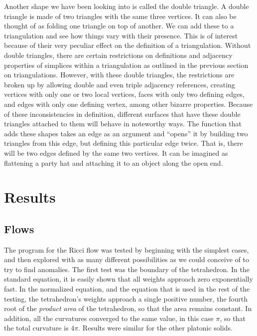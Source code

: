 \documentclass[12pt]{article}
\begin{document}
\begin{itemize}
Another shape we have been looking into is called the double triangle. A double triangle is made of two triangles with the same three vertices. It can also be thought of as folding one triangle on top of another. We can add these to a triangulation and see how things vary with their presence. This is of interest because of their very peculiar effect on the definition of a triangulation. Without double triangles, there are certain restrictions on definitions and adjacency properties of simplices within a triangulation as outlined in the previous section on triangulations. However, with these double triangles, the restrictions are broken up by allowing double and even triple adjacency references, creating vertices with only one or two local vertices, faces with only two defining edges, and edges with only one defining vertex, among other bizarre properties. Because of these inconsistencies in definition, different surfaces that have these double triangles attached to them will behave in noteworthy ways. The function that adds these shapes takes an edge as an argument and ``opens'' it by building two triangles from this edge, but defining this particular edge twice. That is, there will be two edges defined by the same two vertices. It can be imagined as flattening a party hat and attaching it to an object along the open end.
\end{itemize}

\section{Results}

\subsection{Flows}

The program for the Ricci flow was tested by beginning with the simplest cases, and then explored with as many different possibilities as we could conceive of to try to find anomalies. The first test was the boundary of the tetrahedron. In the standard equation, it is easily shown that all weights approach zero exponentially fast. In the normalized equation, and the equation that is used in the rest of the testing, the tetrahedron's weights approach a single positive number, the fourth root of the \textit{product area} of the tetrahedron, so that the area remains constant. In addition, all the curvatures converged to the same value, in this case $\pi$, so that the total curvature is $4\pi$. Results were similar for the other platonic solids.\newline
\end{document}
